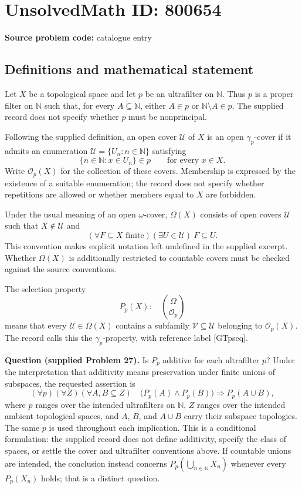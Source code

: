 \documentclass[11pt]{article}
\newcommand{\N}{\mathbb{N}}
\begin{document}
\section*{UnsolvedMath ID: 800654}
\textbf{Source problem code:} catalogue entry
\subsection{Definitions and mathematical statement}
Let \(X\) be a topological space and let \(p\) be an ultrafilter on \(\N\). Thus \(p\) is a proper filter on \(\N\) such that, for every \(A\subseteq\N\), either \(A\in p\) or \(\N\setminus A\in p\). The supplied record does not specify whether \(p\) must be nonprincipal.

Following the supplied definition, an open cover \(\mathcal U\) of \(X\) is an open \(\gamma_p\)-cover if it admits an enumeration \(\mathcal U=\{U_n:n\in\N\}\) satisfying
\[
\{n\in\N:x\in U_n\}\in p
\qquad\text{for every }x\in X.
\]
Write \(\mathcal O_p(X)\) for the collection of these covers. Membership is expressed by the existence of a suitable enumeration; the record does not specify whether repetitions are allowed or whether members equal to \(X\) are forbidden.

Under the usual meaning of an open \(\omega\)-cover, \(\Omega(X)\) consists of open covers \(\mathcal U\) such that \(X\notin\mathcal U\) and
\[
(\forall F\subseteq X\text{ finite})(\exists U\in\mathcal U)\ F\subseteq U.
\]
This convention makes explicit notation left undefined in the supplied excerpt. Whether \(\Omega(X)\) is additionally restricted to countable covers must be checked against the source conventions.

The selection property
\[
P_p(X):\quad \binom{\Omega}{\mathcal O_p}
\]
means that every \(\mathcal U\in\Omega(X)\) contains a subfamily \(\mathcal V\subseteq\mathcal U\) belonging to \(\mathcal O_p(X)\). The record calls this the \(\gamma_p\)-property, with reference label [GTpseq].

\textbf{Question (supplied Problem 27).} Is \(P_p\) additive for each ultrafilter \(p\)? Under the interpretation that additivity means preservation under finite unions of subspaces, the requested assertion is
\[
(\forall p)(\forall Z)(\forall A,B\subseteq Z)\quad
\bigl(P_p(A)\land P_p(B)\bigr)\Longrightarrow P_p(A\cup B),
\]
where \(p\) ranges over the intended ultrafilters on \(\N\), \(Z\) ranges over the intended ambient topological spaces, and \(A\), \(B\), and \(A\cup B\) carry their subspace topologies. The same \(p\) is used throughout each implication. This is a conditional formulation: the supplied record does not define additivity, specify the class of spaces, or settle the cover and ultrafilter conventions above. If countable unions are intended, the conclusion instead concerns \(P_p(\bigcup_{n\in\N}X_n)\) whenever every \(P_p(X_n)\) holds; that is a distinct question.
\end{document}
